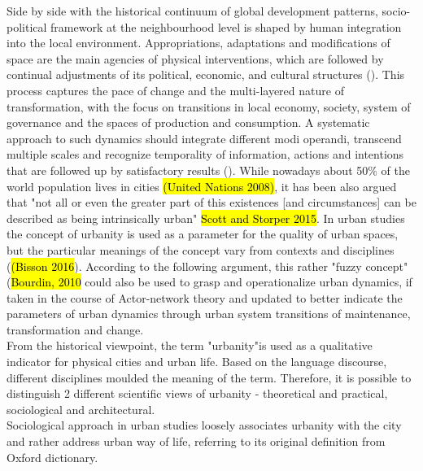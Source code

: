 \documentclass[11pt]{report}
\begin{document}
Side by side with the historical continuum of global development patterns, socio-political framework at the neighbourhood level is shaped by human integration into the local environment. Appropriations, adaptations and modifications of space are the main agencies of physical interventions, which are followed by continual adjustments of its political, economic, and cultural structures (\cite{Sykora 1999}). This process captures the pace of change and the multi-layered nature of transformation, with the focus on transitions in local economy, society, system of governance and the spaces of production and consumption. A systematic approach to such dynamics should integrate different modi operandi, transcend multiple scales and recognize temporality of information, actions and intentions that are followed up by satisfactory results (\cite{Tardin 2014}).
While nowadays about 50\% of the world population lives in cities \hl{(United  Nations 2008)}, it has been also argued that "not all or even the greater part of this existences [and circumstances] can be described as being intrinsically urban" \hl{Scott and Storper 2015}.
In urban studies the concept of urbanity is used as a parameter for the quality of urban spaces, but the particular meanings of the concept vary from contexts and disciplines (\hl{(Bisson 2016}).
According to the following argument, this rather "fuzzy concept" (\hl{Bourdin, 2010} could also be used to grasp and operationalize urban dynamics, if taken in the course of Actor-network theory and updated to better indicate the parameters of urban dynamics through urban system transitions of maintenance, transformation and change.
\\
From the historical viewpoint, the term "urbanity"\footnotemark  is used as a qualitative indicator for physical cities and urban life. 
Based on the language discourse, different disciplines moulded the meaning of the term.
Therefore, it is possible to distinguish 2 different scientific views of urbanity - theoretical and practical, sociological and architectural.
\\
Sociological approach in urban studies loosely associates urbanity with the city and rather address urban way of life, referring to its original definition from Oxford dictionary.
\end{document}

